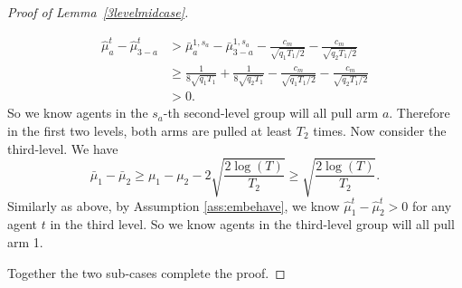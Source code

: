 \begin{proof}[Proof of Lemma~\ref{3levelmidcase}]
\begin{itemize}
\begin{align*}
\hat{\mu}_a^t - \hat{\mu}_{3-a}^t &>\bar{\mu}_a^{1,s_a} - \bar{\mu}_{3-a}^{1,s_a} - \frac{c_m}{\sqrt{q_1T_1/2}} - \frac{c_m}{\sqrt{q_2T_1/2}}\\
&\geq   \frac{1}{8\sqrt{q_1T_1}}+ \frac{1}{8\sqrt{q_2T_1}}- \frac{c_m}{\sqrt{q_1T_1/2}} - \frac{c_m}{\sqrt{q_2T_1/2}}\\
 &> 0.
\end{align*}
So we know agents in the $s_a$-th second-level group will all pull arm $a$. Therefore in the first two levels, both arms are pulled at least $T_2$ times. Now consider the third-level. We have
\[
\bar{\mu}_1 - \bar{\mu}_2  \geq \mu_1 -\mu_2 - 2\sqrt{\frac{2\log(T)}{T_2}} \geq \sqrt{\frac{2\log(T)}{T_2}}.
\]
Similarly as above, by Assumption \ref{ass:embehave}, we know $\hat{\mu}_1^t - \hat{\mu}_2^t > 0$ for any agent $t$ in the third level. So we know agents in the third-level group will all pull arm 1.
\end{itemize}
Together the two sub-cases complete the proof.
\end{proof}